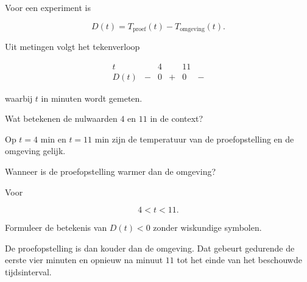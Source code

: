 \documentclass{ximera}
\begin{document}
\begin{oefening}{\oefU\ESS}

Voor een experiment is

\[
D(t)=T_{\mathrm{proef}}(t)-T_{\mathrm{omgeving}}(t).
\]

Uit metingen volgt het tekenverloop

\[
\begin{array}{c|ccccc}
t &  & 4 &  & 11 & \\
\hline
D(t)&-&0&+&0&-
\end{array}
\]

waarbij \(t\) in minuten wordt gemeten.

\begin{question}
Wat betekenen de nulwaarden \(4\) en \(11\) in de context?

\begin{oplossing}
Op \(t=4\) min en \(t=11\) min zijn de temperatuur van de
proefopstelling en de omgeving gelijk.
\end{oplossing}
\end{question}

\begin{question}
Wanneer is de proefopstelling warmer dan de omgeving?

\begin{oplossing}
Voor

\[
4<t<11.
\]
\end{oplossing}
\end{question}

\begin{question}
Formuleer de betekenis van \(D(t)<0\) zonder wiskundige symbolen.

\begin{oplossing}
De proefopstelling is dan kouder dan de omgeving.
Dat gebeurt gedurende de eerste vier minuten en opnieuw na minuut \(11\)
tot het einde van het beschouwde tijdsinterval.
\end{oplossing}
\end{question}

\end{oefening}


\end{document}
